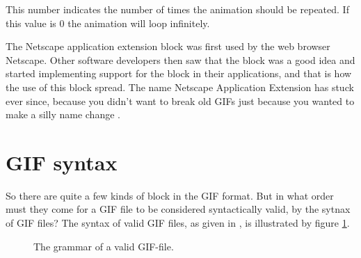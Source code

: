 This number indicates the number of times the animation should be
repeated. If this value is $0$ the animation will loop infinitely.

The Netscape application extension block was first used by the web
browser Netscape. Other software developers then saw that the block
was a good idea and started implementing support for the block in
their applications, and that is how the use of this block spread. The
name Netscape Application Extension has stuck ever since, because you
didn't want to break old GIFs just because you wanted to make a silly
name change \cite{walte96:_web_scrip_secret_weapon}.

\section{GIF syntax}
\label{sec:gif-syntax}
So there are quite a few kinds of block in the GIF format. But in what
order must they come for a GIF file to be considered syntactically
valid, by the sytnax of GIF files? The syntax of valid GIF files, as
given in \cite{gif89a}, is illustrated by figure
\ref{fig:gif-grammar}.

\begin{figure}
  \centering


  \caption{The grammar of a valid GIF-file.}
  \label{fig:gif-grammar}
\end{figure}


